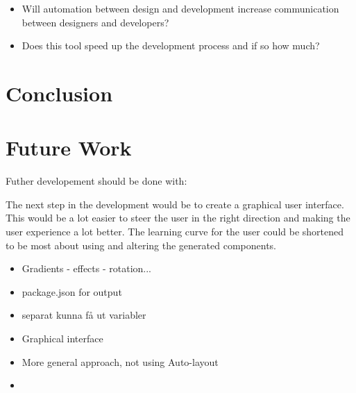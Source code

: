 \begin{itemize}
 \item Will automation between design and development increase communication between designers and developers?
  \item Does this tool speed up the development process and if so how much?
\end{itemize}

\section{Conclusion}
\label{sub:conclusion}

\section{Future Work}%
\label{sub:Future Work}
Futher developement should be done with:

The next step in the development would be to create a graphical user interface. This would be a lot easier to steer the user in the right direction and making the user experience a lot better. The learning curve for the user could be shortened to be most about using and altering the generated components. 

\begin{itemize}
   \item Gradients - effects - rotation...
   \item package.json for output
   \item separat kunna få ut variabler 
   \item Graphical interface 
   \item More general approach, not using Auto-layout
   \item 
\end{itemize}


